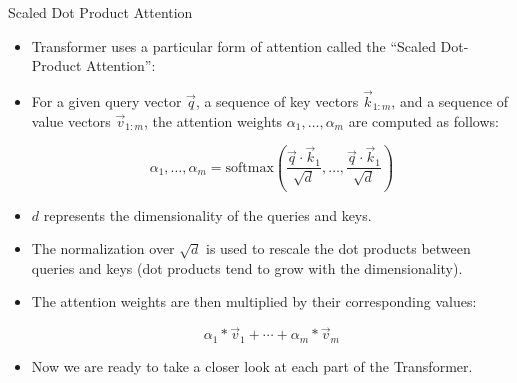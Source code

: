 \documentclass[handout]{beamer}
\begin{document}
\begin{frame}{Scaled Dot Product Attention}
\begin{scriptsize}
\begin{itemize}

  \item  Transformer uses a particular form of attention called the “Scaled Dot-Product Attention”:

  \item For a given query vector $\vec{q}$, a sequence of key vectors $\vec{k}_{1:m}$, and a sequence of value vectors $\vec{v}_{1:m}$,  the attention weights $\alpha_1,\dots,\alpha_m$  are computed as follows:


  \begin{displaymath}
    \alpha_1,\dots,\alpha_m = \text{softmax}\left(\frac{\vec{q} \cdot \vec{k}_{1}}{\sqrt{d}}, \dots,\frac{\vec{q} \cdot \vec{k}_{1}}{\sqrt{d}}\right)
  \end{displaymath}


 \item $d$ represents the dimensionality of the queries and keys.

  \item The normalization over $\sqrt{d}$ is used to rescale the dot products between queries and keys (dot products tend to grow with the dimensionality).

  \item The attention weights are then multiplied by their corresponding values:

  \begin{displaymath}
   \alpha_1*\vec{v}_1+\cdots+\alpha_m*\vec{v}_m
  \end{displaymath}

 \item Now we are ready to take a closer look at each part of the Transformer.


\end{itemize}

\end{scriptsize}

\end{frame}
\end{document}
